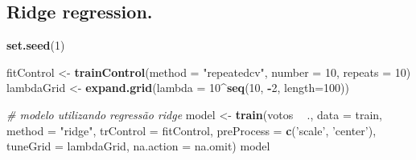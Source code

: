 \documentclass[]{article}
\newenvironment{Shaded}{\begin{snugshade}}{\end{snugshade}}
\newcommand{\KeywordTok}[1]{\textcolor[rgb]{0.13,0.29,0.53}{\textbf{#1}}}
\newcommand{\DataTypeTok}[1]{\textcolor[rgb]{0.13,0.29,0.53}{#1}}
\newcommand{\DecValTok}[1]{\textcolor[rgb]{0.00,0.00,0.81}{#1}}
\newcommand{\StringTok}[1]{\textcolor[rgb]{0.31,0.60,0.02}{#1}}
\newcommand{\CommentTok}[1]{\textcolor[rgb]{0.56,0.35,0.01}{\textit{#1}}}
\newcommand{\OperatorTok}[1]{\textcolor[rgb]{0.81,0.36,0.00}{\textbf{#1}}}
\newcommand{\NormalTok}[1]{#1}
\begin{document}
\subsection{Ridge regression.}\label{ridge-regression.}

\begin{Shaded}
\begin{Highlighting}[]
\KeywordTok{set.seed}\NormalTok{(}\DecValTok{1}\NormalTok{)}

\NormalTok{fitControl <-}\StringTok{ }\KeywordTok{trainControl}\NormalTok{(}\DataTypeTok{method =} \StringTok{"repeatedcv"}\NormalTok{, }\DataTypeTok{number =} \DecValTok{10}\NormalTok{, }\DataTypeTok{repeats =} \DecValTok{10}\NormalTok{)}
\NormalTok{lambdaGrid <-}\StringTok{ }\KeywordTok{expand.grid}\NormalTok{(}\DataTypeTok{lambda =} \DecValTok{10}\OperatorTok{^}\KeywordTok{seq}\NormalTok{(}\DecValTok{10}\NormalTok{, }\OperatorTok{-}\DecValTok{2}\NormalTok{, }\DataTypeTok{length=}\DecValTok{100}\NormalTok{))}

\CommentTok{# modelo utilizando regressão ridge}
\NormalTok{model <-}\StringTok{ }\KeywordTok{train}\NormalTok{(votos }\OperatorTok{~}\StringTok{ }\NormalTok{., }
               \DataTypeTok{data =}\NormalTok{ train,}
               \DataTypeTok{method =} \StringTok{"ridge"}\NormalTok{,}
               \DataTypeTok{trControl =}\NormalTok{ fitControl,}
               \DataTypeTok{preProcess =} \KeywordTok{c}\NormalTok{(}\StringTok{'scale'}\NormalTok{, }\StringTok{'center'}\NormalTok{),}
               \DataTypeTok{tuneGrid =}\NormalTok{ lambdaGrid,}
               \DataTypeTok{na.action =}\NormalTok{ na.omit)}
\NormalTok{model}
\end{Highlighting}
\end{Shaded}
\end{document}
